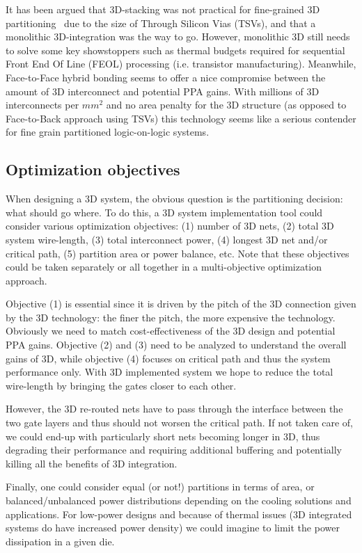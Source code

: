 \documentclass[conference]{IEEEtran}
\begin{document}
It has been argued that 3D-stacking was not practical for fine-grained 3D partitioning~\cite{Samal2017} due to the size of Through Silicon Vias (TSVs), and that a monolithic 3D-integration was the way to go. However, monolithic 3D still needs to solve some key showstoppers such as thermal budgets required for sequential Front End Of Line (FEOL) processing (i.e. transistor manufacturing). Meanwhile, Face-to-Face hybrid bonding seems to offer a nice compromise between the amount of 3D interconnect and potential PPA gains. With millions of 3D interconnects per $mm^2$ and no area penalty for the 3D structure (as opposed to Face-to-Back approach using TSVs) this technology seems like a serious contender for fine grain partitioned logic-on-logic systems.

\subsection{Optimization objectives}
When designing a 3D system, the obvious question is the partitioning decision: what should go where. To do this, a 3D system implementation tool could consider various optimization objectives: (1) number of 3D nets, (2) total 3D system wire-length, (3) total interconnect power, (4) longest 3D net and/or critical path, (5) partition area or power balance, etc. Note that these objectives could be taken separately or all together in a multi-objective optimization approach.

Objective (1) is essential since it is driven by the pitch of the 3D connection given by the 3D technology: the finer the pitch, the more expensive the technology. Obviously we need to match cost-effectiveness of the 3D design and potential PPA gains. Objective (2) and (3) need to be analyzed to understand the overall gains of 3D, while objective (4) focuses on critical path and thus the system performance only. With 3D implemented system we hope to reduce the total wire-length by bringing the gates closer to each other. 

However, the 3D re-routed nets have to pass through the interface between the two gate layers and thus should not worsen the critical path. If not taken care of, we could end-up with particularly short nets becoming longer in 3D, thus degrading their performance and requiring additional buffering and potentially killing all the benefits of 3D integration.

Finally, one could consider equal (or not!) partitions in terms of area, or balanced/unbalanced power distributions depending on the cooling solutions and applications. For low-power designs and because of thermal issues (3D integrated systems do have increased power density) we could imagine to limit the power dissipation in a given die.
\end{document}
